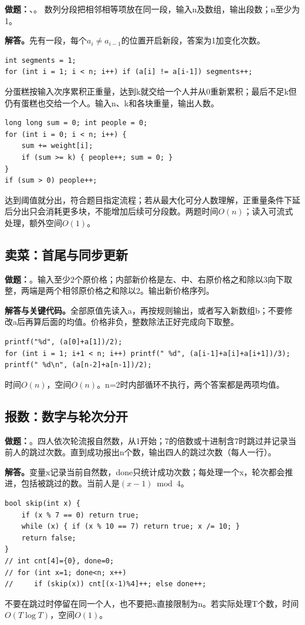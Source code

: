 \noindent\textbf{做题：}、。
数列分段把相邻相等项放在同一段，输入n及数组，输出段数；n至少为1。

\noindent\textbf{解答。}先有一段，每个$a_i\ne a_{i-1}$的位置开启新段，答案为1加变化次数。
\begin{lstlisting}
int segments = 1;
for (int i = 1; i < n; i++) if (a[i] != a[i-1]) segments++;
\end{lstlisting}
分蛋糕按输入次序累积正重量，达到k就交给一个人并从0重新累积；最后不足k但仍有蛋糕也交给一个人。输入n、k和各块重量，输出人数。
\begin{lstlisting}
long long sum = 0; int people = 0;
for (int i = 0; i < n; i++) {
    sum += weight[i];
    if (sum >= k) { people++; sum = 0; }
}
if (sum > 0) people++;
\end{lstlisting}
达到阈值就分出，符合题目指定流程；若从最大化可分人数理解，正重量条件下延后分出只会消耗更多块，不能增加后续可分段数。两题时间$O(n)$；读入可流式处理，额外空间$O(1)$。
\subsection{卖菜：首尾与同步更新}

\noindent\textbf{做题：}。输入至少2个原价格；内部新价格是左、中、右原价格之和除以3向下取整，两端是两个相邻原价格之和除以2。输出新价格序列。

\noindent\textbf{解答与关键代码。}全部原值先读入a，再按规则输出，或者写入新数组b；不要修改a后再算后面的均值。价格非负，整数除法正好完成向下取整。
\begin{lstlisting}
printf("%d", (a[0]+a[1])/2);
for (int i = 1; i+1 < n; i++) printf(" %d", (a[i-1]+a[i]+a[i+1])/3);
printf(" %d\n", (a[n-2]+a[n-1])/2);
\end{lstlisting}
时间$O(n)$，空间$O(n)$。n=2时内部循环不执行，两个答案都是两项均值。
\subsection{报数：数字与轮次分开}

\noindent\textbf{做题：}。四人依次轮流报自然数，从1开始；7的倍数或十进制含7时跳过并记录当前人的跳过次数。直到成功报出n个数，输出四人的跳过次数（每人一行）。

\noindent\textbf{解答。}变量x记录当前自然数，done只统计成功次数；每处理一个x，轮次都会推进，包括被跳过的数。当前人是$(x-1)\bmod4$。
\begin{lstlisting}
bool skip(int x) {
    if (x % 7 == 0) return true;
    while (x) { if (x % 10 == 7) return true; x /= 10; }
    return false;
}
// int cnt[4]={0}, done=0;
// for (int x=1; done<n; x++)
//     if (skip(x)) cnt[(x-1)%4]++; else done++;
\end{lstlisting}
不要在跳过时停留在同一个人，也不要把x直接限制为n。若实际处理T个数，时间$O(T\log T)$，空间$O(1)$。
